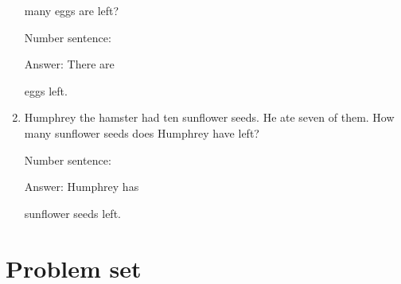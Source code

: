 \documentclass{tufte-book}
\begin{document}
\begin{enumerate}
  many eggs are left?\medskip\par
  Number sentence:
  \dotfill\medskip\par
  Answer: There are
  \dotfill\medskip\par\mbox{}\dotfill\medskip\par\mbox{}\dotfill\bigskip
  eggs left.
\item
  Humphrey the hamster had ten sunflower seeds. He ate seven of them.
  How many sunflower seeds does Humphrey have left?\medskip\par
  Number sentence:
  \dotfill\medskip\par
  Answer: Humphrey has
  \dotfill\medskip\par\mbox{}\dotfill\medskip\par\mbox{}\dotfill\bigskip
  sunflower seeds left.
\end{enumerate}



\clearpage\section{Problem set }
\end{document}
